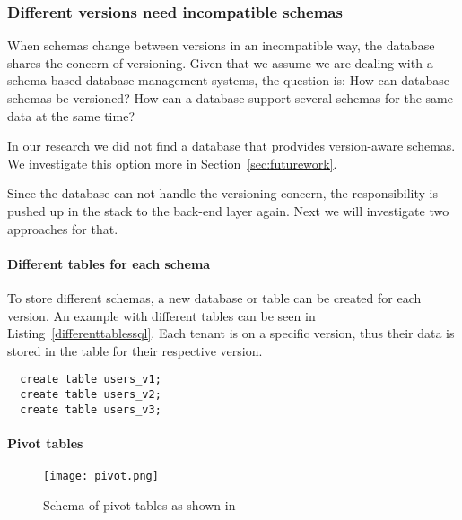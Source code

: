 \subsubsection{Different versions need incompatible schemas}

When schemas change between versions in an incompatible way, the database shares the concern of versioning. Given that we assume we are dealing with a schema-based database management systems, the question is: How can database schemas be versioned? How can a database support several schemas for the same data at the same time?

In our research we did not find a database that prodvides version-aware schemas. We investigate this option more in Section~\ref{sec:futurework}.


Since the database can not handle the versioning concern, the responsibility is pushed up in the stack to the back-end layer again. Next we will investigate two approaches for that.

\paragraph{Different tables for each schema}

To store different schemas, a new database or table can be created for each version. An example with different tables can be seen in Listing~\ref{differenttablessql}. Each tenant is on a specific version, thus their data is stored in the table for their respective version.

\lstset{language=SQL, caption=sql, label=differenttablessql}
\begin{lstlisting}
  create table users_v1;
  create table users_v2;
  create table users_v3;
\end{lstlisting}

%

\paragraph{Pivot tables}

\begin{figure}
\centering
\texttt{[image: pivot.png]}
\caption{Schema of pivot tables as shown in \cite{Yaish2011}}
\label{fig:pivot}
\end{figure}

